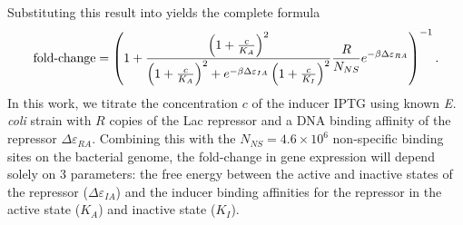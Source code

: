 Substituting this result into \eref[eq5] yields the
complete formula
\begin{equation}\label{eq7}
\operatorname{fold-change}= \left(
1+\frac{\left(1+\frac{c}{K_A}\right)^2}{\left(1+\frac{c}{K_A}\right)^2+e^{-\beta  \Delta \varepsilon_{IA} }\left(1+\frac{c}{K_I}\right)^2}\frac{R}{N_{NS}}e^{-\beta \Delta\varepsilon_{RA}} \right)^{-1}.
\end{equation}
In this work, we titrate the concentration \(c\) of the inducer IPTG using known
\textit{E. coli} strain with \(R\) copies of the Lac repressor and a DNA binding
affinity of the repressor $\Delta\varepsilon_{RA}$. Combining this with the
$N_{NS} = 4.6 \times 10^6$ non-specific binding sites on the bacterial genome,
the fold-change in gene expression will depend solely on 3 parameters: the free
energy between the active and inactive states of the repressor
($\Delta\varepsilon_{IA}$) and the inducer binding affinities for the repressor
in the active state ($K_A$) and inactive state ($K_I$).



